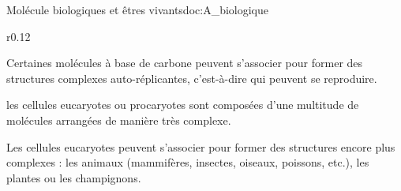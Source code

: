 \begin{doc}{Molécule biologiques et êtres vivants}{doc:A_biologique}
  \begin{wrapfigure}[3]{r}{0.12\linewidth}
    \vspace*{-22pt}
    \centering  
  \end{wrapfigure}
  \strut\vspace*{-18pt}
  
  \begin{importants}
    Certaines molécules à base de carbone peuvent s'associer pour former des structures complexes auto-réplicantes, c'est-à-dire qui peuvent se reproduire.
  \end{importants}
  \exemple les cellules eucaryotes ou procaryotes sont composées d'une multitude de molécules arrangées de manière très complexe.

  \begin{importants}
    Les cellules eucaryotes peuvent s'associer pour former des structures encore plus complexes : les animaux (mammifères, insectes, oiseaux, poissons, etc.), les plantes ou les champignons.
  \end{importants}

  \vspace*{-18pt}
  \begin{center}
  \end{center}
\end{doc}